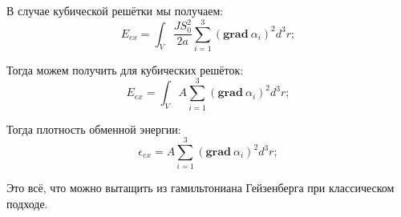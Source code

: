 \documentclass[a4paper, 14pt, russian]{article}
\newcommand{\be}{\begin{equation}}
\newcommand{\ee}{\end{equation}}
\renewcommand{\grad}{\textbf{grad}~}
\begin{document}
	В случае кубической решётки мы получаем:
	\be
		E_{ex} = \int_V \frac{JS_0^2}{2a} \sum_{i =1}^{3} (\grad \alpha_i)^2 d^3 r;
	\ee

	Тогда можем получить для кубических решёток:
	\be
		E_{ex} = \int_V A \sum_{i =1}^{3} (\grad \alpha_i)^2 d^3r;
	\ee

	Тогда плотность  обменной энергии:
	\be
		\epsilon_{ex} = A \sum_{i =1}^{3} (\grad \alpha_i)^2 d^3r;
	\ee

	Это всё, что можно вытащить из гамильтониана Гейзенберга при классическом подходе.
\end{document}
